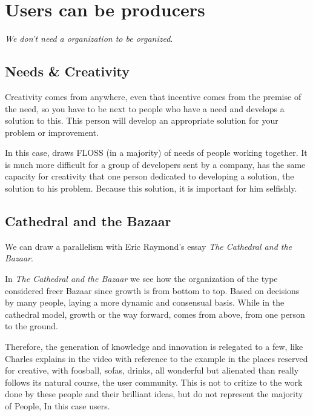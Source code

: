 \documentclass[11pt]{scrartcl}
\begin{document}
\section{Users can be producers}

\emph{We don't need a organization to be organized}\cite{charles-innovation}.

\subsection{Needs \& Creativity}

Creativity comes from anywhere, even that incentive comes from the premise of the need, so you have to be next to people who have a need and develops a solution to this. This person will develop an appropriate solution for your problem or improvement.

In this case, draws FLOSS (in a majority) of needs of people working together. It is much more difficult for a group of developers sent by a company, has the same capacity for creativity that one person dedicated to developing a solution, the solution to his problem. Because this solution, it is important for him selfishly.

\subsection{Cathedral and the Bazaar}
\label{sub:cat-baz}

\par We can draw a parallelism with Eric Raymond's essay \emph{The Cathedral and the Bazaar}\cite{cat-baz}.

\par In \emph{The Cathedral and the Bazaar} we see how the organization of the type considered freer Bazaar since growth is from bottom to top. Based on decisions by many people, laying a more dynamic and consensual basis. While in the cathedral model, growth or the way forward, comes from above, from one person to the ground.

\par Therefore, the generation of knowledge and innovation is relegated to a few, like Charles explains in the video with reference to the example in the places reserved for creative, with foosball, sofas, drinks, all wonderful but alienated than really follows its natural course, the user community. This is not to critize to the work done by these people and their brilliant ideas, but do not represent the majority of People, In this case users.
\end{document}
